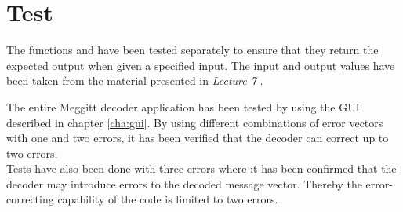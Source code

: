 \documentclass[Main]{subfiles}
\begin{document}
\chapter{Test}
The functions  and  have been tested separately to ensure that they return the expected output when given a specified input. The input and output values have been taken from the material presented in \emph{Lecture 7} \cite{lec7}.

The entire Meggitt decoder application has been tested by using the GUI described in chapter \ref{cha:gui}. By using different combinations of error vectors with one and two errors, it has been verified that the decoder can correct up to two errors.
\\Tests have also been done with three errors where it has been confirmed that the decoder may introduce errors to the decoded message vector. Thereby the error-correcting capability of the code is limited to two errors.
\end{document}
